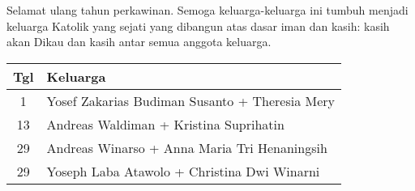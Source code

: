 Selamat ulang tahun perkawinan. Semoga keluarga-keluarga ini tumbuh menjadi keluarga Katolik yang sejati yang dibangun atas dasar iman dan kasih: kasih akan Dikau dan kasih antar semua anggota keluarga.

\begin{longtable}{|c|l|} 
\hline
Tgl & Keluarga \\ \hline
\endhead1& Yosef Zakarias Budiman Susanto + Theresia Mery\\
13& Andreas Waldiman + Kristina Suprihatin\\
29& Andreas Winarso + Anna Maria Tri Henaningsih\\
29& Yoseph Laba Atawolo + Christina Dwi Winarni\\
\hline
\end{longtable}

